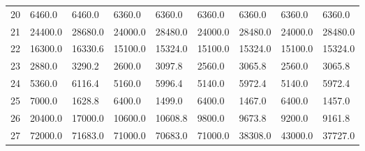 \begin{tabular}{|r|l|l|l|l|l|l|l|l|}
  20 & 6460.0 & 6460.0 & 6360.0 & 6360.0 & 6360.0 & 6360.0 & 6360.0 & 6360.0 \\ 
  21 & 24400.0 & 28680.0 & 24000.0 & 28480.0 & 24000.0 & 28480.0 & 24000.0 & 28480.0 \\ 
  22 & 16300.0 & 16330.6 & 15100.0 & 15324.0 & 15100.0 & 15324.0 & 15100.0 & 15324.0 \\ 
  23 & 2880.0 & 3290.2 & 2600.0 & 3097.8 & 2560.0 & 3065.8 & 2560.0 & 3065.8 \\ 
  24 & 5360.0 & 6116.4 & 5160.0 & 5996.4 & 5140.0 & 5972.4 & 5140.0 & 5972.4 \\ 
  25 & 7000.0 & 1628.8 & 6400.0 & 1499.0 & 6400.0 & 1467.0 & 6400.0 & 1457.0 \\ 
  26 & 20400.0 & 17000.0 & 10600.0 & 10608.8 & 9800.0 & 9673.8 & 9200.0 & 9161.8 \\ 
  27 & 72000.0 & 71683.0 & 71000.0 & 70683.0 & 71000.0 & 38308.0 & 43000.0 & 37727.0 \\ 
\end{tabular}
